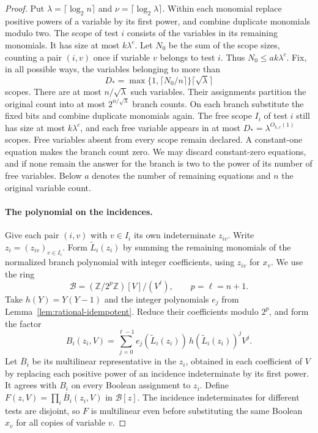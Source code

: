 \begin{proof}
Put $\lambda=\lceil\log_2 n\rceil$ and
$\nu=\lceil\log_2\lambda\rceil$.
Within each monomial replace positive powers of a variable by its
first power, and combine duplicate monomials modulo two. The scope
of test $i$ consists of the variables in its remaining monomials.
It has size at most $k\lambda^c$.
Let $N_0$ be the sum of the scope sizes, counting a pair $(i,v)$
once if variable $v$ belongs to test $i$. Thus $N_0\le ak\lambda^c$.
Fix, in all possible ways, the variables belonging to more than
\[
 D_*=\max\{1,\lceil N_0/n\rceil\}\lceil\sqrt{\lambda}\rceil
\]
scopes. There are at most $n/\sqrt{\lambda}$ such variables. Their
assignments partition the original count into at most
$2^{n/\sqrt{\lambda}}$ branch counts. On each branch substitute the
fixed bits and combine duplicate monomials again. The free scope
$I_i$ of test $i$ still has size at most $k\lambda^c$, and each free
variable appears in at most $D_*=\lambda^{O_{k,c}(1)}$ scopes. Free
variables absent from every scope remain declared. A constant-one
equation makes the branch count zero. We may discard constant-zero
equations, and if none remain the answer for the branch is two to the
power of its number of free variables. Below $a$ denotes the number
of remaining equations and $n$ the original variable count.

\paragraph{The polynomial on the incidences.}
Give each pair $(i,v)$ with $v\in I_i$ its own indeterminate
$z_{iv}$. Write $z_i=(z_{iv})_{v\in I_i}$. Form
$\widetilde L_i(z_i)$ by summing the remaining monomials of the
normalized branch polynomial with integer coefficients, using $z_{iv}$
for $x_v$. We use the ring
\[
 \mathcal B=(\mathbb Z/2^p\mathbb Z)[V]/(V^\ell),
 \qquad p=\ell=n+1 .
\]
Take $h(Y)=Y(Y-1)$ and the integer polynomials $e_j$ from
Lemma~\ref{lem:rational-idempotent}. Reduce their coefficients
modulo $2^p$, and form the factor
\[
 B_i(z_i,V)=\sum_{j=0}^{\ell-1}
   e_j(\widetilde L_i(z_i))\,h(\widetilde L_i(z_i))^j V^j .
\]
Let $\overline B_i$ be its multilinear representative in the $z_i$,
obtained in each coefficient of $V$ by replacing each positive
power of an incidence indeterminate by its first power. It agrees
with $B_i$ on every Boolean assignment to $z_i$. Define
$F(z,V)=\prod_i\overline B_i(z_i,V)$ in $\mathcal B[z]$. The
incidence indeterminates for different tests are disjoint, so $F$
is multilinear even before substituting the same Boolean $x_v$ for
all copies of variable $v$.


\end{proof}
